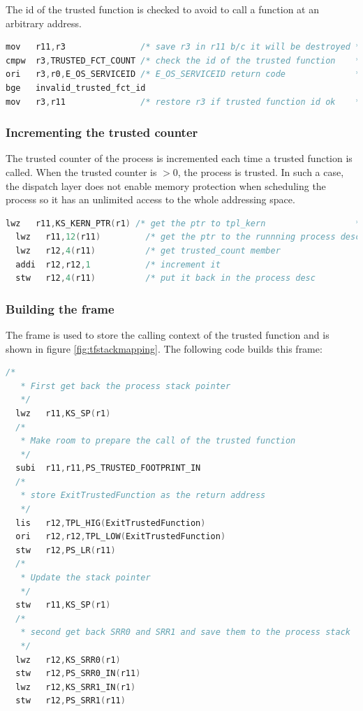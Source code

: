 The id of the trusted function is checked to avoid to call a function at an arbitrary address.

\begin{lstlisting}[language=C]
mov   r11,r3               /* save r3 in r11 b/c it will be destroyed */
cmpw  r3,TRUSTED_FCT_COUNT /* check the id of the trusted function    */
ori   r3,r0,E_OS_SERVICEID /* E_OS_SERVICEID return code              */
bge   invalid_trusted_fct_id
mov   r3,r11               /* restore r3 if trusted function id ok    */
\end{lstlisting}

\subsubsection{Incrementing the trusted counter}

The trusted counter of the process is incremented each time a trusted function is called. When the trusted counter is $>0$, the process is trusted. In such a case, the dispatch layer does not enable memory protection when scheduling the process so it has an unlimited access to the whole addressing space.

\begin{lstlisting}[language=C]
  lwz   r11,KS_KERN_PTR(r1) /* get the ptr to tpl_kern                  */
  lwz   r11,12(r11)         /* get the ptr to the runnning process desc */
  lwz   r12,4(r11)          /* get trusted_count member                 */
  addi  r12,r12,1           /* increment it                             */
  stw   r12,4(r11)          /* put it back in the process desc          */
\end{lstlisting}

\subsubsection{Building the frame}

The frame is used to store the calling context of the trusted function and is shown in figure \ref{fig:tfstackmapping}. The following code builds this frame:

\begin{lstlisting}[language=C]
  /*
   * First get back the process stack pointer
   */
  lwz   r11,KS_SP(r1)
  /*
   * Make room to prepare the call of the trusted function
   */
  subi  r11,r11,PS_TRUSTED_FOOTPRINT_IN
  /*
   * store ExitTrustedFunction as the return address
   */
  lis   r12,TPL_HIG(ExitTrustedFunction)
  ori   r12,r12,TPL_LOW(ExitTrustedFunction)
  stw   r12,PS_LR(r11)
  /*
   * Update the stack pointer
   */
  stw   r11,KS_SP(r1)
  /*
   * second get back SRR0 and SRR1 and save them to the process stack
   */
  lwz   r12,KS_SRR0(r1)
  stw   r12,PS_SRR0_IN(r11)
  lwz   r12,KS_SRR1_IN(r1)
  stw   r12,PS_SRR1(r11)
\end{lstlisting}

